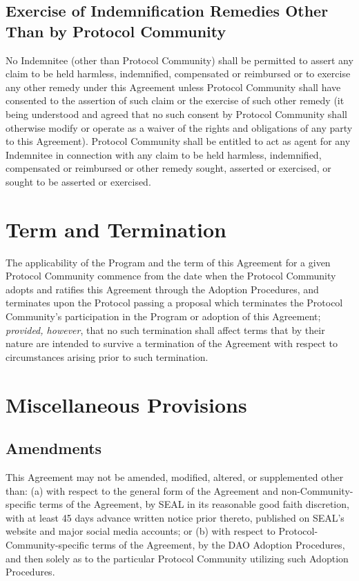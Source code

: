 \documentclass{article}
\begin{document}
\subsection{Exercise of Indemnification Remedies Other Than by Protocol Community}\label{subsec:exercise_indemnification}

No Indemnitee (other than Protocol Community) shall be permitted to assert any claim to be held harmless, indemnified, compensated or reimbursed or to exercise any other remedy under this Agreement unless Protocol Community shall have consented to the assertion of such claim or the exercise of such other remedy (it being understood and agreed that no such consent by Protocol Community shall otherwise modify or operate as a waiver of the rights and obligations of any party to this Agreement). Protocol Community shall be entitled to act as agent for any Indemnitee in connection with any claim to be held harmless, indemnified, compensated or reimbursed or other remedy sought, asserted or exercised, or sought to be asserted or exercised.

\section{Term and Termination}\label{sec:terms}

The applicability of the Program and the term of this Agreement for a given Protocol Community commence from the date when the Protocol Community adopts and ratifies this Agreement through the Adoption Procedures, and terminates upon the Protocol passing a proposal which terminates the Protocol Community's participation in the Program or adoption of this Agreement; \textit{provided, however}, that no such termination shall affect terms that by their nature are intended to survive a termination of the Agreement with respect to circumstances arising prior to such termination.

\section{Miscellaneous Provisions}\label{sec:misc}

\subsection{Amendments}\label{subsec:amendments}

This Agreement may not be amended, modified, altered, or supplemented other than: (a) with respect to the general form of the Agreement and non-Community-specific terms of the Agreement, by SEAL in its reasonable good faith discretion, with at least 45 days advance written notice prior thereto, published on SEAL's website and major social media accounts; or (b) with respect to Protocol-Community-specific terms of the Agreement, by the DAO Adoption Procedures, and then solely as to the particular Protocol Community utilizing such Adoption Procedures.
\end{document}
